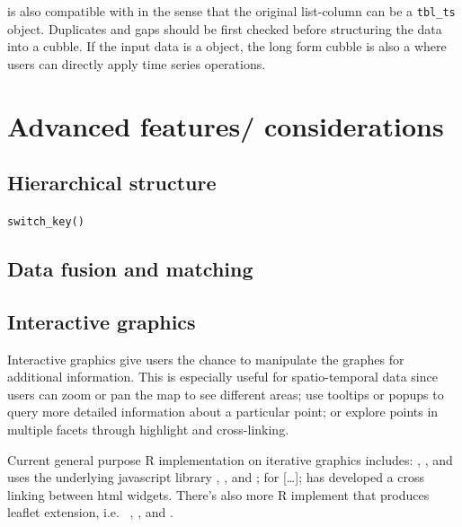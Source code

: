 \documentclass[
]{jss}
\begin{document}
 is also compatible with  in the sense that the
original list-column can be a \texttt{tbl\_ts} object. Duplicates and
gaps should be first checked before structuring the data into a cubble.
If the input data is a  object, the long form cubble is
also a  where users can directly apply time series
operations.

\hypertarget{advanced-features-considerations}{%
\section{Advanced features/
considerations}\label{advanced-features-considerations}}

\hypertarget{hierarchical-structure}{%
\subsection{Hierarchical structure}\label{hierarchical-structure}}

\texttt{switch\_key()}

\hypertarget{data-fusion-and-matching}{%
\subsection{Data fusion and matching}\label{data-fusion-and-matching}}

\hypertarget{interactive-graphics}{%
\subsection{Interactive graphics}\label{interactive-graphics}}

Interactive graphics give users the chance to manipulate the graphes for
additional information. This is especially useful for spatio-temporal
data since users can zoom or pan the map to see different areas; use
tooltips or popups to query more detailed information about a particular
point; or explore points in multiple facets through highlight and
cross-linking.

Current general purpose R implementation on iterative graphics includes:
 \citep{plotly},  \citep{leaflet}, and
 \citep{mapdeck} uses the underlying javascript library
, , and ; 
\citep{ggiraph} for {[}\ldots{]};  \citep{crosstalk} has
developed a cross linking between html widgets. There's also more R
implement that produces leaflet extension, i.e.~ \citep{tmap},
 \citep{mapview}, and  \citep{leafpop}.
\end{document}
